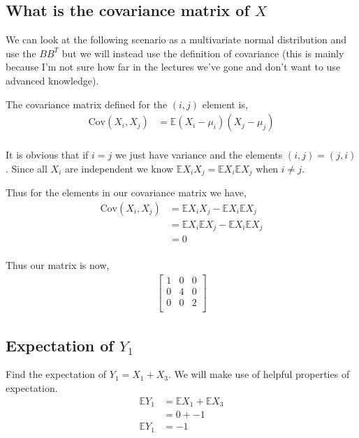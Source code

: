 \documentclass{article}
\newcommand{\expect}{\mathbb{E}}
\begin{document}
\subsection{What is the covariance matrix of $X$}
We can look at the following scenario as a multivariate normal distribution
and use the $B B^T$ but we will instead use the definition of covariance
(this is mainly because I'm not sure how far in the lectures we've gone
and don't want to use advanced knowledge).

The covariance matrix defined for the $(i,j)$ element is,
\begin{align*}
    \text{Cov}(X_i,X_j) & = \expect (X_i - \mu_i)(X_j - \mu_j) \\
\end{align*}

It is obvious that if $i = j$ we just have variance and the elements
$(i, j) = (j ,i)$. Since all $X_i$ are independent we know
$\expect X_i X_j = \expect X_i \expect X_j$ when $i \neq j$.

Thus for the elements in our covariance matrix we have,
\begin{align*}
    \text{Cov}(X_i,X_j) & = \expect X_i X_j - \expect X_i \expect X_j \\
    & = \expect X_i \expect X_j - \expect X_i \expect X_j \\
    & = 0 \\
\end{align*}

Thus our matrix is now,
\begin{align*}
    \begin{bmatrix}
        1 & 0 & 0 \\
        0 & 4 & 0 \\
        0 & 0 & 2 \\
    \end{bmatrix}
\end{align*}

\subsection{Expectation of $Y_1$}
Find the expectation of $Y_1 = X_1 + X_3$. We will make use of helpful
properties of expectation.
\begin{align*}
    \expect Y_1 &= \expect X_1 + \expect X_3 \\
    &= 0 + -1 \\
    \expect Y_1 &= -1 \\
\end{align*}
\end{document}
